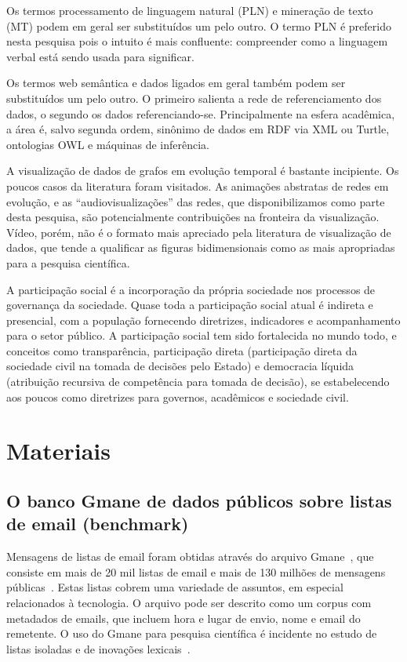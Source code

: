 \documentclass[a4paper,openright,12pt]{report} %
\begin{document}
Os termos processamento de linguagem natural (PLN) e mineração de
texto (MT) podem em geral ser substituídos um pelo outro.
O termo PLN é preferido nesta pesquisa pois o intuito é mais confluente: 
compreender como a linguagem verbal está
sendo usada para significar.

Os termos web semântica e dados ligados em geral também podem ser 
substituídos um pelo outro. O primeiro salienta
a rede de referenciamento dos dados,
o segundo os dados referenciando-se. Principalmente na esfera
acadêmica, a área é, salvo segunda ordem, sinônimo de dados em 
RDF via XML ou Turtle, ontologias OWL e máquinas de inferência.

A visualização de dados de grafos em evolução temporal é bastante
incipiente. Os poucos casos da literatura foram visitados. As
animações abstratas de redes em evolução, e as ``audiovisualizações''
das redes, que disponibilizamos como parte desta pesquisa,
são potencialmente contribuições na fronteira da visualização.
Vídeo, porém, não é o formato mais apreciado pela literatura
de visualização de dados, que tende a qualificar as figuras
bidimensionais como as mais apropriadas para a pesquisa
científica.

A participação social é a incorporação da própria sociedade nos 
processos de governança da sociedade.
Quase toda a participação social atual é indireta e presencial, 
com a população fornecendo diretrizes, indicadores e acompanhamento
para o setor público.
A participação social tem sido fortalecida no mundo todo,
e conceitos como transparência, participação direta (participação direta 
da sociedade civil na tomada de decisões pelo Estado) e
democracia líquida (atribuição recursiva de competência para tomada
de decisão), se estabelecendo aos poucos como diretrizes para
governos, acadêmicos e sociedade civil.

\chapter{Materiais}\label{sec:mat}
\section{O banco Gmane de dados públicos sobre listas de email (benchmark)}
Mensagens de listas de email foram obtidas através do arquivo Gmane~\cite{gmanePack},
que consiste em mais de 20 mil listas de email e mais de 130 milhões de mensagens públicas~\cite{GMANEwikipedia}.
Estas listas cobrem uma variedade de assuntos, em especial
relacionados à tecnologia. O arquivo pode ser descrito como
um corpus com metadados de emails, que incluem hora e lugar
de envio, nome e email do remetente. O uso do Gmane para
pesquisa científica é incidente no estudo de listas isoladas
e de inovações lexicais~\cite{GMANE2,bird}. 
\end{document}
